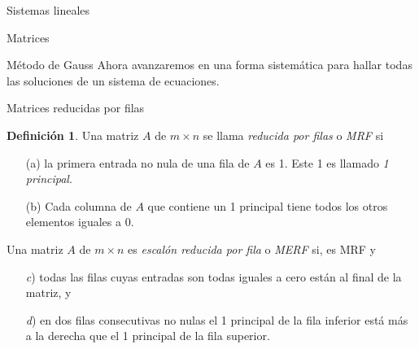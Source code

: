\documentclass[a4paper,12pt,twoside,spanish,reqno]{amsbook}
\theoremstyle{definition}
\newtheorem{definicion}{Definici\'on}[section]
\theoremstyle{remark}
\begin{document}
\begin{chapter}{Sistemas lineales}
\begin{section}{Matrices}
		
		\end{section}
	
	
	
			\begin{section}{Método de Gauss } Ahora avanzaremos en una forma sistemática para hallar todas las soluciones de un sistema de ecuaciones.
	
			
			\begin{subsection}{Matrices reducidas por filas} 
				
				\begin{definicion}
					Una matriz $A$ de $m \times n$ se llama \textit{reducida por filas} o \textit{MRF} si 
					\begin{enumerate}
						\item[(a)] la primera entrada no nula de una fila de $A$ es 1. Este 1 es llamado \textit{1 principal}.
						\item[(b)] Cada columna de $A$ que contiene un  1 principal tiene todos los otros elementos iguales a 0. 
					\end{enumerate} 
				Una matriz $A$ de $m \times n$ es \textit{escalón reducida por fila} o \textit{MERF} si,  es  MRF y
				\begin{enumerate}
					\item[\textit{c})] todas las filas cuyas entradas son todas iguales a cero están al final de la matriz, y
					\item[\textit{d})] en dos filas consecutivas no nulas el 1 principal de la fila inferior está más a la derecha que el 1 principal de la fila superior. 
				\end{enumerate}
				
				\end{definicion} 
				

\end{subsection}
\end{section}
\end{chapter}
\end{document}
